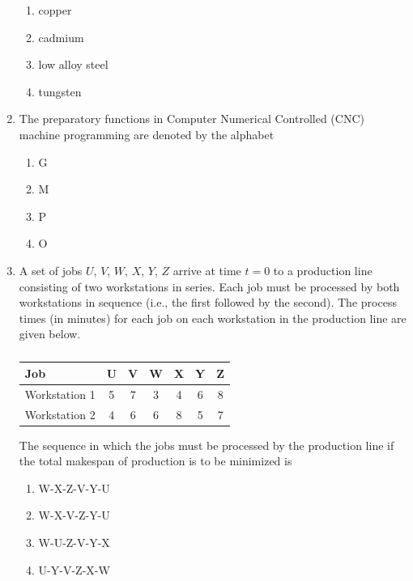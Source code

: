 \documentclass[journal,11pt,onecolumn]{IEEEtran}
\begin{document}
\begin{enumerate}[resume]
          \begin{enumerate}
              \item copper
              \item cadmium
              \item low alloy steel
              \item tungsten
          \end{enumerate}

    \item The preparatory functions in Computer Numerical Controlled (CNC) machine programming are denoted by the alphabet

          \begin{enumerate}
              \item G
              \item M
              \item P
              \item O
          \end{enumerate}

    \item A set of jobs $U$, $V$, $W$, $X$, $Y$, $Z$ arrive at time $t = 0$ to a production line consisting of two workstations in series. Each job must be processed by both workstations in sequence (i.e., the first followed by the second). The process times (in minutes) for each job on each workstation in the production line are given below.

          \begin{table}[H]
              \centering
              \begin{tabular}{|l|c|c|c|c|c|c|}
                  \hline
                  Job           & U & V & W & X & Y & Z \\
                  \hline
                  Workstation 1 & 5 & 7 & 3 & 4 & 6 & 8 \\
                  \hline
                  Workstation 2 & 4 & 6 & 6 & 8 & 5 & 7 \\
                  \hline
              \end{tabular}
              \caption{}
              \label{t34}
          \end{table}

          The sequence in which the jobs must be processed by the production line if the total makespan of production is to be minimized is

          \begin{enumerate}
              \item W-X-Z-V-Y-U
              \item W-X-V-Z-Y-U
              \item W-U-Z-V-Y-X
              \item U-Y-V-Z-X-W
          \end{enumerate}


\end{enumerate}
\end{document}
